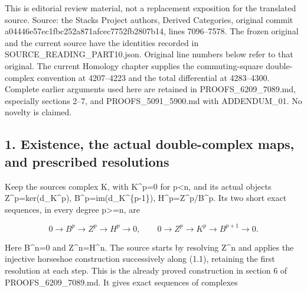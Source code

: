 \documentclass[11pt]{article}
\begin{document}
This is editorial review material,\allowbreak{} not a replacement exposition for the translated source. Source:\allowbreak{} the Stacks Project authors,\allowbreak{} Derived Categories,\allowbreak{} original commit a04446e5\allowbreak{}7ec1fbc2\allowbreak{}52a871af\allowbreak{}cec7752f\allowbreak{}b2807b14, lines 7096–\allowbreak{}7578. The frozen original and the current source have the identities recorded in SOURCE\_\allowbreak{}READING\_\allowbreak{}PART10.json. Original line numbers below refer to that original. The current Homology chapter supplies the commuting-square double-complex convention at 4207–\allowbreak{}4223 and the total differential at 4283–\allowbreak{}4300. Complete earlier arguments used here are retained in PROOFS\_\allowbreak{}6209\_\allowbreak{}7089.md,\allowbreak{} especially sections 2–\allowbreak{}7,\allowbreak{} and PROOFS\_\allowbreak{}5091\_\allowbreak{}5900.md with ADDENDUM\_\allowbreak{}01. No novelty is claimed.

\subsection{\texorpdfstring{1. Existence,\allowbreak{} the actual double-complex maps,\allowbreak{} and prescribed resolutions}{1.  the actual double-complex  and prescribed resolutions}}\label{proofs-7096-7578-existence-the-actual-double-complex-maps-and-prescribed-resolutions}

Keep the source\textquotesingle s complex K,\allowbreak{} with K\textasciicircum{}p\allowbreak{}=0 for p<n,\allowbreak{} and its actual objects Z\textasciicircum{}p\allowbreak{}=ker(d\_\allowbreak{}K\textasciicircum{}p)\allowbreak{},\allowbreak{} B\textasciicircum{}p\allowbreak{}=im(d\_\allowbreak{}K\textasciicircum{}\{p-1\})\allowbreak{},\allowbreak{} H\textasciicircum{}p\allowbreak{}=Z\textasciicircum{}p/\allowbreak{}B\textasciicircum{}p. Its two short exact sequences,\allowbreak{} in every degree p>\allowbreak{}=n,\allowbreak{} are

\[
 0\longrightarrow B^p\longrightarrow Z^p\longrightarrow H^p
       \longrightarrow0,\qquad
 0\longrightarrow Z^p\longrightarrow K^p\longrightarrow B^{p+1}
       \longrightarrow0.                                      \tag{1.1}
\]

Here B\textasciicircum{}n\allowbreak{}=0 and Z\textasciicircum{}n\allowbreak{}=H\textasciicircum{}n. The source starts by resolving Z\^{}n and applies the injective horseshoe construction successively along (1.1)\allowbreak{},\allowbreak{} retaining the first resolution at each step. This is the already proved construction in section 6 of PROOFS\_\allowbreak{}6209\_\allowbreak{}7089.md. It gives exact sequences of complexes
\end{document}
